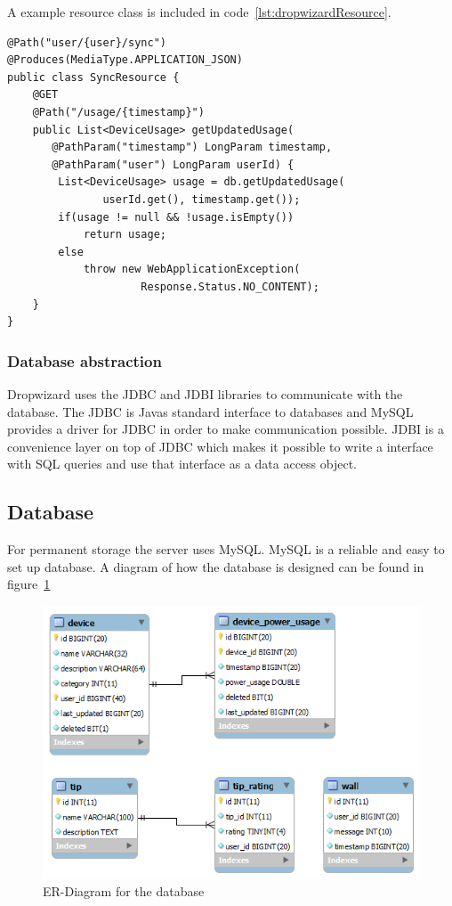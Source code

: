 A example resource class is included in code~\ref{lst:dropwizardResource}.

\begin{lstlisting}[caption={Dropwizard resource example}, label={lst:dropwizardResource}]
@Path("user/{user}/sync")
@Produces(MediaType.APPLICATION_JSON)
public class SyncResource {
    @GET
    @Path("/usage/{timestamp}")
    public List<DeviceUsage> getUpdatedUsage(
	   @PathParam("timestamp") LongParam timestamp, 
	   @PathParam("user") LongParam userId) {
        List<DeviceUsage> usage = db.getUpdatedUsage(
		       userId.get(), timestamp.get());
        if(usage != null && !usage.isEmpty())
            return usage;
        else
            throw new WebApplicationException(
			         Response.Status.NO_CONTENT);
    }
}
\end{lstlisting}

\subsubsection{Database abstraction}
Dropwizard uses the JDBC and JDBI libraries to communicate with the database. The JDBC is Javas standard interface to databases and MySQL provides a driver for JDBC in order to make communication possible. JDBI is a convenience layer on top of JDBC which makes it possible to write a interface with SQL queries and use that interface as a data access object.

\subsection{Database}
For permanent storage the server uses MySQL. MySQL is a reliable and easy to set up database. A diagram of how the database is designed can be found in figure~\ref{fig:ER-Diagram}

\begin{figure}[H]
\includegraphics[width=\textwidth]{ch/architecture/fig/ER-Diagram.png}
\caption{ER-Diagram for the database}
\label{fig:ER-Diagram}
\end{figure}